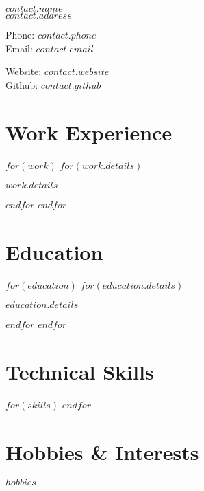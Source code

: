 \documentclass{cv-class}
\begin{document}
{\LARGE $contact.name$}\\[0.2cm]
$contact.address$

\begin{minipage}[t]{0.6\textwidth}
  Phone: $contact.phone$\\
  Email: \href{mailto:$contact.email$}{$contact.email$}
\end{minipage}%
\hfill
\begin{minipage}[t]{0.4\textwidth}
  \begin{flushright}
    Website: \href{https://$contact.website$}{$contact.website$}\\
    Github: \href{https://$contact.github$}{$contact.github$}
  \end{flushright}
\end{minipage}

\section*{Work Experience}
$for(work)$
$for(work.details)$
\begin{workitem}
  \item $work.details$
\end{workitem}
$endfor$
$endfor$

\section*{Education}
$for(education)$
$for(education.details)$
\begin{educationitem}
  \item $education.details$
\end{educationitem}
$endfor$
$endfor$

\section*{Technical Skills}
$for(skills)$
$endfor$

\section*{Hobbies \& Interests}
$hobbies$
\end{document}
